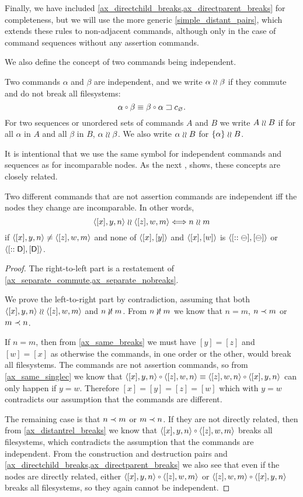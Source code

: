 Finally, we have included \cref{ax_directchild_breaks,ax_directparent_breaks}
for completeness, but we will use the more generic \cref{simple_distant_pairs},
which extends these rules to non-adjacent commands, although only in the case
of command sequences without any assertion commands.





\myskip
We also define the concept of two commands being independent.

\begin{mydef}
Two commands $\alpha$ and $\beta$ 
are independent, and we write $\alpha\mathrel{\wr\wr}\beta$ if 
they commute and do not break all filesystems:
\[ \alpha\cc\beta \equiv \wrksx{\beta\cc\alpha}. \]
For two sequences or unordered sets of commands $A$ and $B$ we write $A\mathrel{\wr\wr} B$ if
for all $\alpha$ in $A$ and all $\beta$ in $B$, $\alpha\mathrel{\wr\wr}\beta$.
We also write $\alpha\mathrel{\wr\wr} B$ for $\{\alpha\}\mathrel{\wr\wr} B$.
\end{mydef}

It is intentional that we use the same symbol for independent commands
and sequences as for incomparable nodes. As the next
,
shows, these concepts are closely related.

\begin{mylem}
Two different commands that are not assertion commands are independent 
iff the nodes they change are incomparable. In other words,
\[ \langle{[x],y,n}\rangle\mathrel{\wr\wr}\langle{[z],w,m}\rangle \Longleftrightarrow n\mathrel{\wr\wr} m \]
if $\langle{[x],y,n}\rangle\neq\langle{[z],w,m}\rangle$ and none of $\langle{[x],[y]}\rangle$ and $\langle{[x],[w]}\rangle$ is $\langle{[::\ominus],[\ominus]}\rangle$ or $\langle{[::\mathsf{D}],[\mathsf{D}]}\rangle$.
\end{mylem}
\begin{proof}
The right-to-left part is a restatement of
\cref{ax_separate_commute,ax_separate_nobreaks}.

We prove the left-to-right part by contradiction,
assuming that both $\langle{[x],y,n}\rangle\mathrel{\wr\wr}\langle{[z],w,m}\rangle$ and $n\nunrel m$.
From $n\nunrel m$
we know that $n=m$, $n\prec m$ or $m\prec n$.

If $n=m$, then from \cref{ax_same_breaks} we must have $[y]=[z]$ and $[w]=[x]$
as otherwise the commands, in one order or the other, would break all filesystems.
The commands are not assertion commands, so from \cref{ax_same_singlec}
we know that $\cxynv\cc\czwnv\equiv\czwnv\cc\cxynv$ can only happen if $y=w$.
Therefore $[x]=[y]=[z]=[w]$ which with $y=w$ contradicts our assumption that the commands are different.

The remaining case is that $n\prec m$ or $m\prec n$.
If they are not directly related,
then from \cref{ax_distantrel_breaks} we know that
$\cxynv\cc\czwmv$ breaks all filesystems,
which contradicts the assumption that the commands are independent.
From the construction and destruction pairs and 
\cref{ax_directchild_breaks,ax_directparent_breaks} we also see that
even if the nodes are directly related, either
$\cxynv\cc\czwmv$ or $\czwmv\cc\cxynv$ 
breaks all filesystems, so they again cannot be independent.
\end{proof}

